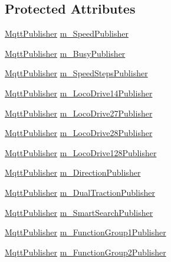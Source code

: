 \subsection*{Protected Attributes}
\begin{DoxyCompactItemize}
\item 
\hyperlink{classIoTT_1_1MqttPublisher}{Mqtt\+Publisher} \hyperlink{classIoTT_1_1LocDecoder_a2e1e77d6b6afbfc596bacf9e610676f7}{m\+\_\+\+Speed\+Publisher}
\item 
\hyperlink{classIoTT_1_1MqttPublisher}{Mqtt\+Publisher} \hyperlink{classIoTT_1_1LocDecoder_a57f18c1655e45585bb6607bb629f5bfb}{m\+\_\+\+Busy\+Publisher}
\item 
\hyperlink{classIoTT_1_1MqttPublisher}{Mqtt\+Publisher} \hyperlink{classIoTT_1_1LocDecoder_ae2dd932a3ab756c89a4aebd98a01fc13}{m\+\_\+\+Speed\+Steps\+Publisher}
\item 
\hyperlink{classIoTT_1_1MqttPublisher}{Mqtt\+Publisher} \hyperlink{classIoTT_1_1LocDecoder_a1e985100d61d364be2ee6993028bc2c5}{m\+\_\+\+Loco\+Drive14\+Publisher}
\item 
\hyperlink{classIoTT_1_1MqttPublisher}{Mqtt\+Publisher} \hyperlink{classIoTT_1_1LocDecoder_a26e0b69d61545ff21162636a15aa8c07}{m\+\_\+\+Loco\+Drive27\+Publisher}
\item 
\hyperlink{classIoTT_1_1MqttPublisher}{Mqtt\+Publisher} \hyperlink{classIoTT_1_1LocDecoder_a0ef958619a0e3917b815253581a9645c}{m\+\_\+\+Loco\+Drive28\+Publisher}
\item 
\hyperlink{classIoTT_1_1MqttPublisher}{Mqtt\+Publisher} \hyperlink{classIoTT_1_1LocDecoder_a19c3d3f0edadf124539500659441a604}{m\+\_\+\+Loco\+Drive128\+Publisher}
\item 
\hyperlink{classIoTT_1_1MqttPublisher}{Mqtt\+Publisher} \hyperlink{classIoTT_1_1LocDecoder_a450cfd7a96ec279708c3dddc66db437c}{m\+\_\+\+Direction\+Publisher}
\item 
\hyperlink{classIoTT_1_1MqttPublisher}{Mqtt\+Publisher} \hyperlink{classIoTT_1_1LocDecoder_ae538104fb9df1988e119728cbbc18460}{m\+\_\+\+Dual\+Traction\+Publisher}
\item 
\hyperlink{classIoTT_1_1MqttPublisher}{Mqtt\+Publisher} \hyperlink{classIoTT_1_1LocDecoder_ada7028c3eb96dcba778025c1e4886030}{m\+\_\+\+Smart\+Search\+Publisher}
\item 
\hyperlink{classIoTT_1_1MqttPublisher}{Mqtt\+Publisher} \hyperlink{classIoTT_1_1LocDecoder_ac8af77095ccacdf2b770500699fe3e77}{m\+\_\+\+Function\+Group1\+Publisher}
\item 
\hyperlink{classIoTT_1_1MqttPublisher}{Mqtt\+Publisher} \hyperlink{classIoTT_1_1LocDecoder_a0d1397da3871f5fc207aaf5c542381aa}{m\+\_\+\+Function\+Group2\+Publisher}

\end{DoxyCompactItemize}
